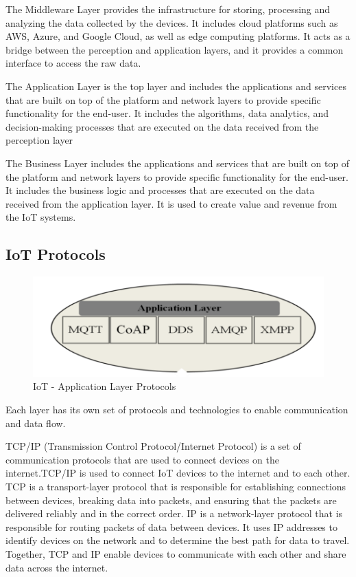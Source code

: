 \documentclass{article}
\begin{document}
The Middleware Layer provides the infrastructure for storing, processing and analyzing the data collected by the devices. It includes cloud platforms such as AWS, Azure, and Google Cloud, as well as edge computing platforms. It acts as a bridge between the perception and application layers, and it provides a common interface to access the raw data.


The Application Layer is the top layer and includes the applications and services that are built on top of the platform and network layers to provide specific functionality for the end-user. It includes the algorithms, data analytics, and decision-making processes that are executed on the data received from the perception layer


The Business Layer includes the applications and services that are built on top of the platform and network layers to provide specific functionality for the end-user. It includes the business logic and processes that are executed on the data received from the application layer. It is used to create value and revenue from the IoT systems.



\subsection{IoT Protocols}

\begin{figure}[h!]
    \centering
    \includegraphics[width=\linewidth]{appLayerProtocols.PNG}
    \caption{IoT - Application Layer Protocols}
    \label{fig:my_label}
\end{figure}

Each layer has its own set of protocols and technologies to enable communication and data flow.

TCP/IP (Transmission Control Protocol/Internet Protocol) is a set of communication protocols that are used to connect devices on the internet.TCP/IP is used to connect IoT devices to the internet and to each other. TCP is a transport-layer protocol that is responsible for establishing connections between devices, breaking data into packets, and ensuring that the packets are delivered reliably and in the correct order. IP is a network-layer protocol that is responsible for routing packets of data between devices. It uses IP addresses to identify devices on the network and to determine the best path for data to travel. Together, TCP and IP enable devices to communicate with each other and share data across the internet.
\end{document}
